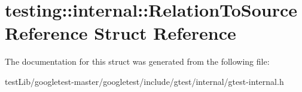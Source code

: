 \hypertarget{structtesting_1_1internal_1_1RelationToSourceReference}{}\section{testing\+:\+:internal\+:\+:Relation\+To\+Source\+Reference Struct Reference}
\label{structtesting_1_1internal_1_1RelationToSourceReference}


The documentation for this struct was generated from the following file\+:\begin{DoxyCompactItemize}
\item 
test\+Lib/googletest-\/master/googletest/include/gtest/internal/gtest-\/internal.\+h\end{DoxyCompactItemize}
